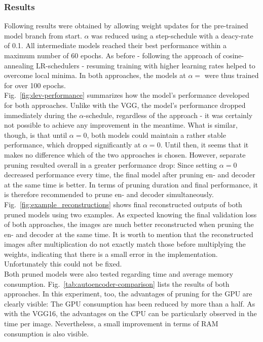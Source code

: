 \documentclass[10pt,twocolumn,letterpaper]{article}
\begin{document}
\subsubsection{Results}
Following results were obtained by allowing weight updates for the pre-trained model branch from start.
$\alpha$ was reduced using a step-schedule with a deacy-rate of 0.1.
All intermediate models reached their best performance within a maximum number of 60 epochs.
As before - following the approach of cosine-annealing LR-schedulers - resuming training with higher learning rates helped to overcome local minima.
In both approaches, the models at $\alpha=$ were thus trained for over 100 epochs.\\
Fig.~\ref{fig:dev-performance} summarizes how the model's performance developed for both approaches.
Unlike with the VGG, the model's performance dropped immediately during the $\alpha$-schedule, regardless of the approach - it was certainly not possible to achieve any improvement in the meantime.
What is similar, though, is that until $\alpha=0$, both models could maintain a rather stable performance, which dropped significantly at $\alpha=0$.
Until then, it seems that it makes no difference which of the two approaches is chosen.
However, separate pruning resulted overall in a greater performance drop:
Since setting $\alpha=0$ decreased performance every time, the final model after pruning en- and decoder at the same time is better.
In terms of pruning duration and final performance, it is therefore recommended to prune en- and decoder simultaneously.\\
Fig.~\ref{fig:example_reconstructions} shows final reconstructed outputs of both pruned models using two examples.
As expected knowing the final validation loss of both approaches, the images are much better reconstructed when pruning the en- and decoder at the same time.
It is worth to mention that the reconstructed images after multiplication do not exactly match those before multiplying the weights, indicating that there is a small error in the implementation.
Unfortunately this could not be fixed.\\
Both pruned models were also tested regarding time and average memory consumption.
Fig.~\ref{tab:autoencoder-comparison} lists the results of both approaches.
In this experiment, too, the advantages of pruning for the GPU are clearly visible:
The GPU consumption has been reduced by more than a half.
As with the VGG16, the advantages on the CPU can be particularly observed in the time per image.
Nevertheless, a small improvement in terms of RAM consumption is also visible.
\end{document}
